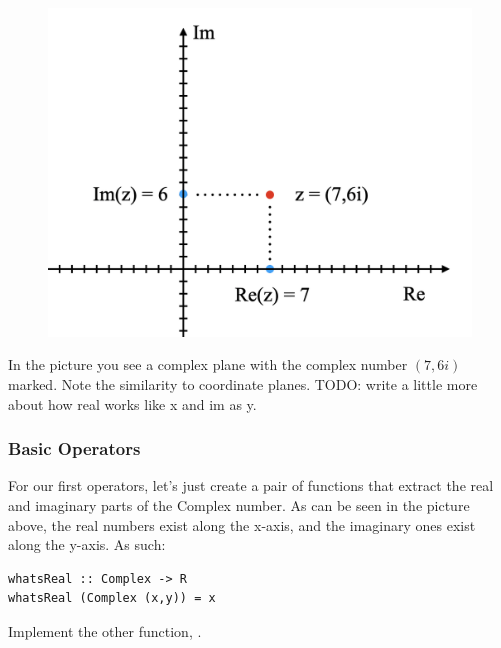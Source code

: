 \begin{figure}[h!]
    \centering
    \includegraphics[scale= 0.4]{Argand.png}
    \caption{}
    \label{argand}
\end{figure}


In the picture you see a complex plane with the complex number $(7,6i)$ marked. Note the similarity to coordinate planes. TODO: write a little more about how real works like x and im as y. 

\subsubsection{Basic Operators}

For our first operators, let's just create a pair of functions that extract the real and imaginary parts of the Complex number. As can be seen in the picture above, the real numbers exist along the x-axis, and the imaginary ones exist along the y-axis. As such:
\begin{verbatim}
whatsReal :: Complex -> R
whatsReal (Complex (x,y)) = x

\end{verbatim}

\begin{exercise}
Implement the other function, . 
\end{exercise}

